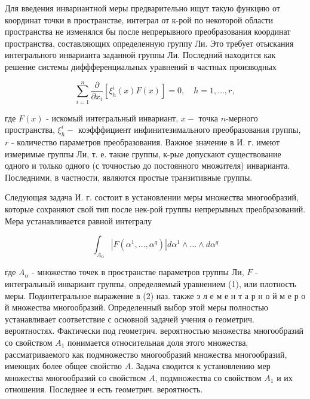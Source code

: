 \documentclass[10pt]{article}
\begin{document}
Для введения инвариантной меры предварительно ищут такую функцию от координат точки в пространстве, интеграл от к-рой по некоторой области пространства не изменялся бы после непрерывного преобразования координат пространства, составляющих определенную группу Ли. Это требует отыскания интегрального инварианта заданной группы Ли. Последний находится как решение системы диффференциальных уравнений в частных производных



\[

\sum_{i=1}^{n} \frac{\partial}{\partial x_{i}}\left[\xi_{h}^{i}(x) F(x)\right]=0, \quad h=1, \ldots, r,

\]



где $F(x)$ - искомый интегральный инвариант, $x-$ точка $n$-мерного пространства, $\xi_{h}^{i}-$ коэфффициент инфинитезимального преобразования группы, $r$ - количество параметров преобразования. Важное значение в И. г. имеют измеримые группы Ли, т. е. такие группы, к-рые допускают существование одного и только одного (с точностью до постоянного множителя) инварианта. Последними, в частности, являются простые транзитивные группы.



Следующая задача И. г. состоит в установлении меры множества многообразий, которые сохраняют свой тип после нек-рой группы непрерывных преобразований. Мера устанавливается равной интегралу



\[

\int_{A_{\alpha}}\left|F\left(\alpha^{1}, \ldots, \alpha^{q}\right)\right| d \alpha^{1} \wedge \ldots \wedge d \alpha^{q}

\]



где $A_{\alpha}$ - множество точек в пространстве параметров группы Ли, $F$ - интегральный инвариант группы, определяемый уравнением (1), или плотность меры. Подинтегральное выражение в (2) наз. также э л е м е н т а р н о й м е р о й множества многообразий. Определенный выбор этой меры полностью устанавливает соответствие с основной задачей учения о геометрич. вероятностях. Фактически под геометрич. вероятностью множества многообразий со свойством $A_{1}$ понимается относительная доля этого множества, рассматриваемого как подмножество многообразий множества многообразий, имеющих более общее свойство $A$. Задача сводится к установлению мер множества многообразий со свойством $A$, подмножества со свойством $A_{1}$ и их отношения. Последнее и есть геометрич. вероятность.
\end{document}
